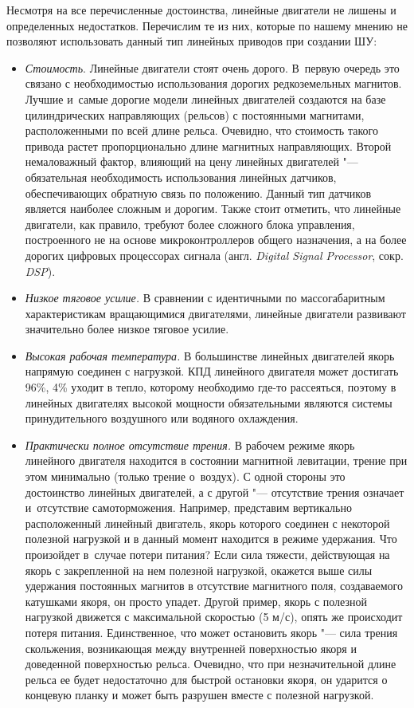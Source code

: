 Несмотря на все перечисленные достоинства, линейные двигатели не лишены и определенных недостатков. Перечислим те из них, которые по нашему мнению не позволяют использовать данный тип линейных приводов при создании ШУ:

\begin{itemize}
	\item \textit{Стоимость}. Линейные двигатели стоят очень дорого. В~первую очередь это связано с необходимостью использования дорогих редкоземельных магнитов. Лучшие и~самые дорогие модели линейных двигателей создаются на базе цилиндрических направляющих (рельсов) с постоянными магнитами, расположенными по всей длине рельса. Очевидно, что стоимость такого привода растет пропорционально длине магнитных направляющих. Второй немаловажный фактор, влияющий на цену линейных двигателей "--- обязательная необходимость использования линейных датчиков, обеспечивающих обратную связь по положению. Данный тип датчиков является наиболее сложным и дорогим. Также стоит отметить, что линейные двигатели, как правило, требуют более сложного блока управления, построенного не на основе микроконтроллеров общего назначения, а на более дорогих цифровых процессорах сигнала (англ. \textit{Digital Signal Processor}, сокр. \textit{DSP}).
	
	\item \textit{Низкое тяговое усилие.} В сравнении с идентичными по массогабаритным характеристикам вращающимися двигателями, линейные двигатели развивают значительно более низкое тяговое усилие.
	
	\item \textit{Высокая рабочая температура.} В большинстве линейных двигателей якорь напрямую соединен с нагрузкой. КПД линейного двигателя может достигать 96\%, 4\% уходит в тепло, которому необходимо где-то рассеяться, поэтому в линейных двигателях высокой мощности обязательными являются системы принудительного воздушного или водяного охлаждения.
	
	\item \textit{Практически полное отсутствие трения.} В рабочем режиме якорь линейного двигателя находится в состоянии магнитной левитации, трение при этом минимально (только трение о~воздух). С одной стороны это достоинство линейных двигателей, а с другой "--- отсутствие трения означает и~отсутствие самоторможения. Например, представим вертикально расположенный линейный двигатель, якорь которого соединен с некоторой полезной нагрузкой и в данный момент находится в режиме удержания. Что произойдет в~случае потери питания? Если сила тяжести, действующая на якорь с закрепленной на нем полезной нагрузкой, окажется выше силы удержания постоянных магнитов в отсутствие магнитного поля, создаваемого катушками якоря, он просто упадет. Другой пример, якорь с полезной нагрузкой движется с максимальной скоростью (5 м/с), опять же происходит потеря питания. Единственное, что может остановить якорь "--- сила трения скольжения, возникающая между внутренней поверхностью якоря и доведенной поверхностью рельса. Очевидно, что при незначительной длине рельса ее будет недостаточно для быстрой остановки якоря, он ударится о концевую планку и может быть разрушен вместе с полезной нагрузкой.
	

\end{itemize}

